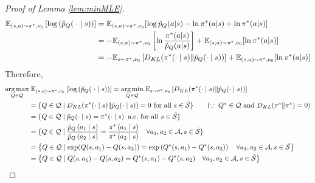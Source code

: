\begin{proof}[Proof of Lemma \ref{lem:minMLE}]
    \begin{align}
    \mathbb{E}_{(s, a)\sim \pi^*, \nu_0}  \left[\log\left(\hat{p}_{Q}(\;\cdot
    \mid s)\right)\right] & = 
\mathbb{E}_{(s,a)\sim\pi^*, \nu_0} [\log \hat{p}_{Q}(a|s) - \ln \pi^*(a|s) + \ln \pi^*(a|s)]\notag \\
    &=-\mathbb{E}_{(s,a)\sim\pi^*, \nu_0} \left[\ln \frac{\pi^*(a|s)}{\hat{p}_{Q}(a|s)} \right] + \mathbb{E}_{(s,a)\sim\pi^*, \nu_0} [\ln \pi^*(a|s)]\notag \\
    &= -\mathbb{E}_{s\sim\pi^*, \nu_0} \left[D_{KL}(\pi^*(\cdot\mid s) \| \hat{p}_{Q}(\cdot\mid s))\right] + \mathbb{E}_{(s,a)\sim\pi^*, \nu_0} [\ln \pi^*(a|s)]\notag \notag
\end{align}
Therefore,
\begin{align}
    \underset{Q\in\mathcal{Q}}{\arg\max}&\; \mathbb{E}_{(s, a)\sim \pi^*, \nu_0}  \left[\log\left(\hat{p}_{Q}(\;\cdot
    \mid s)\right)\right] =\underset{Q\in\mathcal{Q}}{\arg\min}\;\mathbb{E}_{s\sim\pi^*, \nu_0} \left[D_{KL}(\pi^*(\cdot\mid s) \| \hat{p}_{Q}(\cdot\mid s))\right]\notag
    \\
    &=\{Q\in\mathcal{Q}\mid D_{KL}(\pi^*(\cdot\mid s) \| \hat{p}_{Q}(\cdot\mid s))=0 \text{ for all }s\in\bar{\mathcal{S}}\} \tag{$\because \; Q^*\in \mathcal{Q}$ and $D_{KL}(\pi^* \| \pi^*)=0$}\notag
    \\
    &=\{Q\in\mathcal{Q}\mid \hat{p}_Q(\cdot \mid s)=\pi^*(\cdot \mid s)\; \; \text{a.e.} \text{ for all }s\in\bar{\mathcal{S}}\}\notag
    \\
    &= \{Q\in\mathcal{Q}\mid \frac{\hat{p}_Q\left(a_1 \mid s\right)}{\hat{p}_Q\left(a_2 \mid s\right)}=\frac{\pi^*\left(a_1 \mid s\right)}{\pi^*\left(a_2 \mid s\right)} \quad \forall a_1, a_2 \in \mathcal{A}, s\in\bar{\mathcal{S}}\}\notag   
    \\
    &=\left\{Q \in \mathcal{Q} \mid \exp (Q(s,a_1)-Q(s,a_2))=\exp \left(Q^*(s,a_1)-Q^*(s,a_2)\right) \quad \forall a_1, a_2\in\mathcal{A}, s\in\bar{\mathcal{S}} \right\}\notag
    \\
    &=\left\{Q \in \mathcal{Q} \mid Q(s,a_1)-Q(s,a_2)= Q^*(s,a_1)-Q^*(s,a_2) \quad \forall a_1, a_2\in\mathcal{A}, s\in\bar{\mathcal{S}}\right\} \notag
\end{align}
\end{proof}

